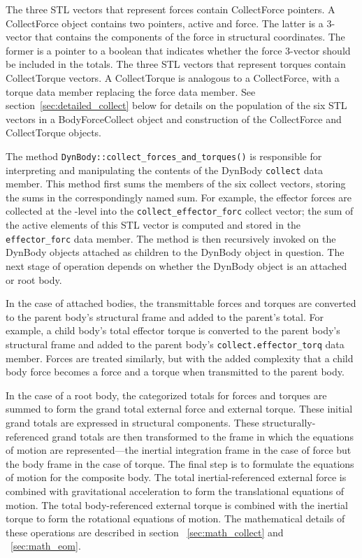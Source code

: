 The three STL vectors that represent forces contain CollectForce pointers.
A CollectForce object contains two pointers, active and force. The latter is a
3-vector that contains the components of the force in structural coordinates.
The former is a pointer to a boolean that indicates whether the force 3-vector
should be included in the totals.
The three STL vectors that represent torques contain CollectTorque vectors.
A CollectTorque is analogous to a CollectForce, with a torque data member
replacing the force data member.
See section~\ref{sec:detailed_collect} below for details on the
population of the six STL vectors in a BodyForceCollect object and
construction of the CollectForce and CollectTorque objects.

The method \verb+DynBody::collect_forces_and_torques()+ is responsible for
interpreting and manipulating the contents of the DynBody \verb+collect+ data
member. This method first sums the members of the six collect vectors, storing
the sums in the correspondingly named sum. For example, the effector forces
are collected at the \Sdefine-level into the \verb+collect_effector_forc+
collect vector; the sum of the active elements of this STL vector is computed
and stored in the \verb+effector_forc+ data member. The method is then
recursively invoked on the DynBody objects attached as children to the DynBody
object in question. The next stage of operation depends on whether the DynBody
object is an attached or root body.

In the case of attached bodies, the transmittable forces and torques are
converted to the parent body's structural frame and added to the parent's total.
For example, a child body's total effector torque is converted to the parent
body's structural frame and added to the parent body's
\verb+collect.effector_torq+ data member.
Forces are treated similarly, but with the added complexity that a child body
force becomes a force and a torque when transmitted to the parent body.

In the case of a root body, the categorized totals for forces and torques are
summed to form the grand total external force and external torque. These
initial grand totals are expressed in structural components.
These structurally-referenced grand totals are then transformed to the
frame in which the equations of motion are represented---the inertial
integration frame in the case of force but the body frame in the case of torque.
The final step is to formulate the equations of motion for the composite body. The total inertial-referenced external force is combined with gravitational
acceleration to form the translational equations of motion.
The total body-referenced external torque is combined with the
inertial torque to form the rotational equations of motion.
The mathematical details of these operations are described in section
~\ref{sec:math_collect} and ~\ref{sec:math_eom}.

